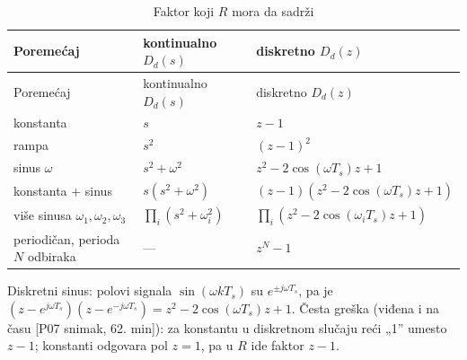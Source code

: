 \documentclass[11pt,a4paper,parskip=half,headsepline,numbers=noenddot]{scrartcl}
\DeclareRobustCommand{\izvor}[1]{{\small\color{izvorC}[#1]}}
\begin{document}
\begin{longtable}[]{@{}
  >{\raggedright\arraybackslash}p{}
  >{\centering\arraybackslash}p{}
  >{\centering\arraybackslash}p{}@{}}
\caption{Faktor koji \(R\) mora da sadrži}\tabularnewline
\toprule\noalign{}
\begin{minipage}[b]{\linewidth}\raggedright
Poremećaj
\end{minipage} & \begin{minipage}[b]{\linewidth}\centering
kontinualno \(D_d(s)\)
\end{minipage} & \begin{minipage}[b]{\linewidth}\centering
diskretno \(D_d(z)\)
\end{minipage} \\
\midrule\noalign{}
\endfirsthead
\toprule\noalign{}
\begin{minipage}[b]{\linewidth}\raggedright
Poremećaj
\end{minipage} & \begin{minipage}[b]{\linewidth}\centering
kontinualno \(D_d(s)\)
\end{minipage} & \begin{minipage}[b]{\linewidth}\centering
diskretno \(D_d(z)\)
\end{minipage} \\
\midrule\noalign{}
\endhead
\bottomrule\noalign{}
\endlastfoot
konstanta & \(s\) & \(z - 1\) \\
rampa & \(s^2\) & \((z-1)^2\) \\
sinus \(\omega\) & \(s^2 + \omega^2\) & \(z^2 - 2\cos(\omega T_s)z + 1\) \\
konstanta + sinus & \(s(s^2 + \omega^2)\) & \((z-1)(z^2 - 2\cos(\omega T_s)z + 1)\) \\
više sinusa \(\omega_1, \omega_2, \omega_3\) & \(\prod_i (s^2 + \omega_i^2)\) & \(\prod_i (z^2 - 2\cos(\omega_i T_s)z + 1)\) \\
periodičan, perioda \(N\) odbiraka & --- & \(z^N - 1\) \\
\end{longtable}

Diskretni sinus: polovi signala \(\sin(\omega kT_s)\) su \(e^{\pm j\omega T_s}\), pa je \((z - e^{j\omega T_s})(z - e^{-j\omega T_s}) = z^2 - 2\cos(\omega T_s)z + 1\). Česta greška (viđena i na času \izvor{P07 snimak, 62. min}): za konstantu u diskretnom slučaju reći „1'' umesto \(z - 1\); konstanti odgovara pol \(z = 1\), pa u \(R\) ide faktor \(z - 1\).
\end{document}
